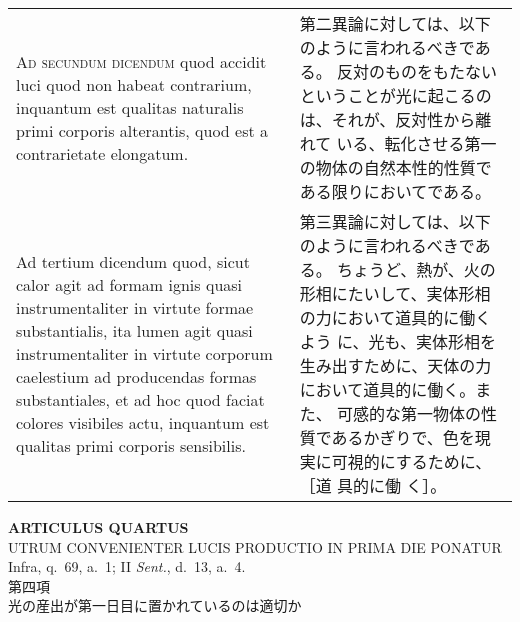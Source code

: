 \documentclass[10pt]{jsarticle} %
\begin{document}
\begin{longtable}{p{21em}p{21em}}
{\scshape Ad secundum dicendum} quod accidit luci quod
non habeat contrarium, inquantum est qualitas naturalis primi corporis
alterantis, quod est a contrarietate elongatum.

&


第二異論に対しては、以下のように言われるべきである。
反対のものをもたないということが光に起こるのは、それが、反対性から離れて
 いる、転化させる第一の物体の自然本性的性質である限りにおいてである。


\\


{\sc Ad tertium dicendum} quod, sicut calor agit ad
formam ignis quasi instrumentaliter in virtute formae substantialis, ita
lumen agit quasi instrumentaliter in virtute corporum caelestium ad
producendas formas substantiales, et ad hoc quod faciat colores
visibiles actu, inquantum est qualitas primi corporis sensibilis.

&

第三異論に対しては、以下のように言われるべきである。
ちょうど、熱が、火の形相にたいして、実体形相の力において道具的に働くよう
 に、光も、実体形相を生み出すために、天体の力において道具的に働く。また、
 可感的な第一物体の性質であるかぎりで、色を現実に可視的にするために、［道
 具的に働
 く］。



\end{longtable}
\newpage





\begin{center}
 {\Large {\bf ARTICULUS QUARTUS}}\\
 {\large UTRUM CONVENIENTER LUCIS PRODUCTIO IN PRIMA DIE PONATUR}\\
 {\footnotesize Infra, q.~69, a.~1; II {\itshape Sent.}, d.~13, a.~4.}\\
 {\Large 第四項\\光の産出が第一日目に置かれているのは適切か}
\end{center}
\end{document}
